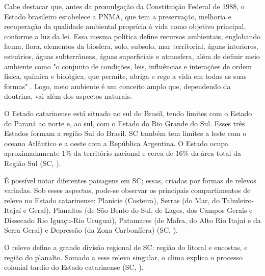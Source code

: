 \indent Cabe destacar que, antes da promulgação da Constituição Federal de 1988, o Estado brasileiro estabelece a \acrfull{PNMA}, que tem a preservação, melhoria e recuperação da qualidade ambiental proprícia à vida como objetivo principal, conforme a luz da lei. Essa mesma política define recursos ambientais, englobando fauna, flora, elementos da biosfera, solo, subsolo, mar territorial, águas interiores, estuários, águas subterrâneas, águas superficiais e atmosfera, além de definir meio ambiente como "o conjunto de condições, leis, influências e interações de ordem física, química e biológica, que permite, abriga e rege a vida em todas as suas formas" \cite{BRASIL1981LeiPNMA}. Logo, meio ambiente é um conceito amplo que, dependendo da doutrina, vai além dos aspectos naturais.  

\indent O Estado catarinense está situado no sul do Brasil, tendo limites com o Estado do Paraná ao norte e, ao sul, com o Estado do Rio Grande do Sul. Esses três Estados  formam a região Sul do Brasil. \acrlong{SC} também tem limites a leste com o oceano Atlântico e a oeste com a República Argentina.  O Estado ocupa aproximadamente 1\% da território nacional e  cerca de 16\% da área total da Região Sul (\acrlong{SC}, \citeyear{AtlasSCterritorio}).

\indent É possível notar diferentes paisagens em \acrlong{SC}; essas, criadas por formas de relevos variadas. Sob esses aspectos, pode-se observar os principais compartimentos de relevo no Estado catarinense: Planície (Costeira), Serras (do Mar, do Tabuleiro-Itajaí e Geral), Planaltos (de São Bento do Sul, de Lages, dos Campos Gerais e Dissecado Rio Iguaçu-Rio Uruguai), Patamares (de Mafra, do Alto Rio Itajaí e da Serra Geral) e Depressão (da Zona Carbonífera) (\acrlong{SC}, \citeyear{AtlasSCnatureza}).

\indent O relevo define a grande divisão regional de \acrlong{SC}: região do
litoral e encostas, e região do planalto. Somado a esse relevo singular, o clima explica o processo colonial tardio do Estado catarinense (\acrlong{SC}, \citeyear{AtlasSCpopulacao}).


